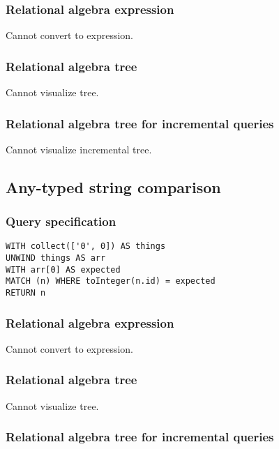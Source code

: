 \subsubsection*{Relational algebra expression}

Cannot convert to expression.

\subsubsection*{Relational algebra tree}

Cannot visualize tree.

\subsubsection*{Relational algebra tree for incremental queries}

Cannot visualize incremental tree.

\subsection{Any-typed string comparison}

\subsubsection*{Query specification}

\begin{lstlisting}
WITH collect(['0', 0]) AS things
UNWIND things AS arr
WITH arr[0] AS expected
MATCH (n) WHERE toInteger(n.id) = expected
RETURN n
\end{lstlisting}

\subsubsection*{Relational algebra expression}

Cannot convert to expression.

\subsubsection*{Relational algebra tree}

Cannot visualize tree.

\subsubsection*{Relational algebra tree for incremental queries}


